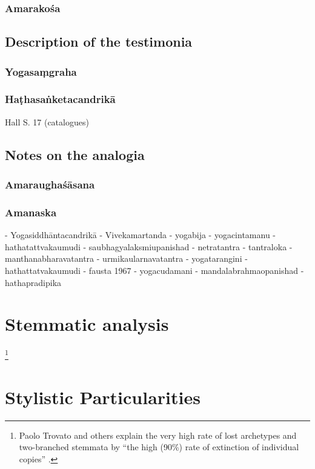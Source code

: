 \subsubsection{Amarakośa}

\subsection{Description of the testimonia}

\subsubsection{Yogasaṃgraha}
\label{yogasamgraha}
\subsubsection{Haṭhasaṅketacandrikā}
\label{hathacandrika}
Hall S. 17 (catalogues) 

\subsection{Notes on the analogia}

\subsubsection{Amaraughaśāsana}
\subsubsection{Amanaska}

- Yogasiddhāntacandrikā
- Vivekamartanda
- yogabija
- yogacintamanu
- hathatattvakaumudi
- saubhagyalaksmiupanishad
- netratantra
- tantraloka
-manthanabharavatantra
- urmikaularnavatantra
- yogatarangini
- hathattatvakaumudi
- fausta 1967
- yogacudamani
- mandalabrahmaopanishad
- hathapradipika 

\section{Stemmatic analysis}
\label{stemma}
\footnote{Paolo Trovato and others explain the very high rate of lost archetypes and two-branched stemmata by ``the high (90\%) rate of extinction of individual copies'' \parencite[86]{trovato2017}.}

\section{Stylistic Particularities}

